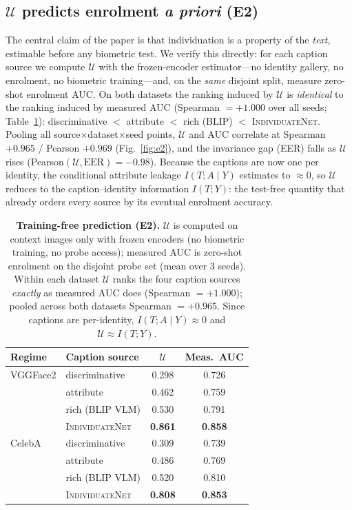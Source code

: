 \documentclass[10pt,twocolumn,letterpaper]{article}
\newcommand{\U}{\mathcal{U}}
\newcommand{\method}{\textsc{IndividuateNet}}
\begin{document}
\subsection{$\U$ predicts enrolment \emph{a priori} (E2)}
\label{sec:e2}
The central claim of the paper is that individuation is a property of the \emph{text}, estimable
before any biometric test. We verify this directly: for each caption source we compute $\U$ with
the frozen-encoder estimator---no identity gallery, no enrolment, no biometric training---and, on
the \emph{same} disjoint split, measure zero-shot enrolment AUC. On both datasets the ranking
induced by $\U$ is \emph{identical} to the ranking induced by measured AUC
(Spearman $=+1.000$ over all seeds; Table~\ref{tab:predict}): discriminative $<$ attribute $<$
rich (BLIP) $<$ \method{}. Pooling all source$\times$dataset$\times$seed points, $\U$ and AUC
correlate at Spearman $+0.965$ / Pearson $+0.969$ (Fig.~\ref{fig:e2}), and the invariance gap (EER) falls as $\U$
rises (Pearson$(\U,\text{EER})=-0.98$). Because the captions are now one per identity, the
conditional attribute leakage $I(T;A\mid Y)$ estimates to $\approx 0$, so $\U$ reduces to the
caption--identity information $I(T;Y)$: the test-free quantity that already orders every source
by its eventual enrolment accuracy.

\begin{table}[t]
  \centering\small
  \setlength{\tabcolsep}{5pt}
  \begin{tabular}{@{}llcc@{}}
    \toprule
    \textbf{Regime} & \textbf{Caption source} & $\U$ & \textbf{Meas.\ AUC} \\
    \midrule
    VGGFace2 & discriminative    & 0.298 & 0.726 \\
             & attribute         & 0.462 & 0.759 \\
             & rich (BLIP VLM)   & 0.530 & 0.791 \\
             & \method{}         & \textbf{0.861} & \textbf{0.858} \\
    \midrule
    CelebA   & discriminative    & 0.309 & 0.739 \\
             & attribute         & 0.486 & 0.769 \\
             & rich (BLIP VLM)   & 0.520 & 0.810 \\
             & \method{}         & \textbf{0.808} & \textbf{0.853} \\
    \bottomrule
  \end{tabular}
  \caption{\textbf{Training-free prediction (E2).} $\U$ is computed on context images only with
  frozen encoders (no biometric training, no probe access); measured AUC is zero-shot enrolment
  on the disjoint probe set (mean over 3 seeds). Within each dataset $\U$ ranks the four caption
  sources \emph{exactly} as measured AUC does (Spearman $=+1.000$); pooled across both datasets
  Spearman $=+0.965$. Since captions are per-identity, $I(T;A\mid Y)\!\approx\!0$ and
  $\U\!\approx\!I(T;Y)$.}
  \label{tab:predict}
\end{table}
\end{document}
